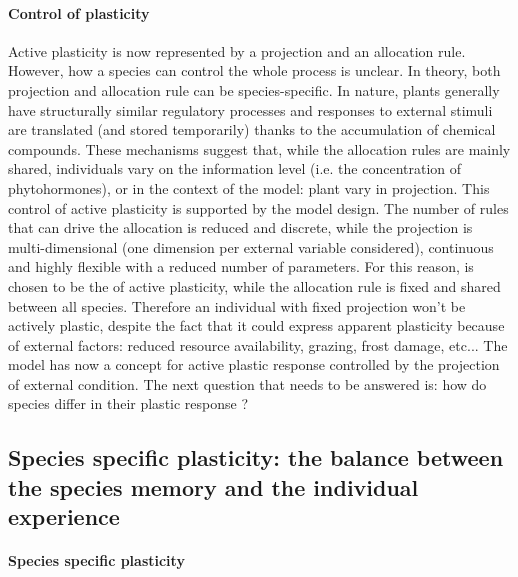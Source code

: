 \paragraph{Control of plasticity}
Active plasticity is now represented by a projection and an allocation rule. However, how a species can control the whole process is unclear. In theory, both projection and allocation rule can be species-specific. In nature, plants generally have structurally similar regulatory processes and responses to external stimuli are translated (and stored temporarily) thanks to the accumulation of chemical compounds. These mechanisms suggest that, while the allocation rules are mainly shared, individuals vary on the information level (i.e. the concentration of phytohormones), or in the context of the model: plant vary in projection. This control of active plasticity is supported by the model design. The number of rules that can drive the allocation is reduced and discrete, while the projection is multi-dimensional (one dimension per external variable considered), continuous and highly flexible with a reduced number of parameters.
For this reason,  is chosen to be the  of active plasticity, while the allocation rule is fixed and shared between all species. Therefore an individual with fixed projection won't be actively plastic, despite the fact that it could express apparent plasticity because of external factors: reduced resource availability, grazing, frost damage, etc... The model has now a concept for active plastic response controlled by the projection of external condition. The next question that needs to be answered is: how do species differ in their plastic response ?\\

\subsection{Species specific plasticity: the balance between the species memory and the individual experience}

\paragraph{Species specific plasticity}

